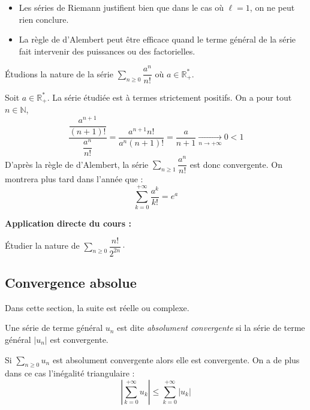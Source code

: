 \documentclass[french,11pt,twoside]{VcCours}
\newenvironment{ApplicationDirecte}{\textbf{Application directe du cours :}

}{}
\newcommand{\Sum}[2]{\ensuremath{\textstyle{\sum\limits_{#1}^{#2}}}}
\begin{document}
\begin{Remarques}{}
	\begin{itemize}
\item Les séries de Riemann justifient bien que dans le cas où $\ell=1$, on ne peut rien conclure.
\item La règle de d'Alembert peut être efficace quand le terme général de la série fait intervenir des puissances ou des factorielles.
	\end{itemize}
\end{Remarques}

\newpage
\begin{Exemple} Étudions la nature de la série $\Sum{n \geq 0}{} \dfrac{a^n}{n!}$ où $a \in \mathbb{R}_+^{*}$.


Soit $a \in \mathbb{R}_{+}^*$. La série étudiée est à termes strictement positifs. On a pour tout $n \in \mathbb{N}$,
$$ \dfrac{\dfrac{a^{n+1}}{(n+1)!}}{\dfrac{a^n}{n!}} = \frac{a^{n+1}n!}{a^n(n+1)!}= \frac{a}{n+1} \underset{n \rightarrow + \infty}{\longrightarrow} 0 <1$$
D'après la règle de d'Alembert, la série $\Sum{n \geq 1}{} \dfrac{a^n}{n!}$ est donc convergente. On montrera plus tard dans l'année que :
$$ \sum_{k=0}^{+\infty} \frac{a^k}{k!} = e^a$$
\end{Exemple}

\begin{ApplicationDirecte} Étudier la nature de $\Sum{n \geq 0}{} \dfrac{n!}{2^{2n}}\cdot$
\end{ApplicationDirecte}
\subsection{Convergence absolue}

Dans cette section, la suite est réelle ou complexe.

\begin{Definition}{} Une série de terme général $u_n$ est dite \emph{absolument convergente} si la série de terme général $\vert u_n \vert$ est convergente.
\end{Definition}

\begin{Theoreme}{} Si $\Sum{n \geq 0}{} u_n$ est absolument convergente alors elle est convergente. On a de plus dans ce cas l'inégalité triangulaire :
$$ \left\vert \sum_{k=0}^{+ \infty} u_k \right\vert \leq \sum_{k=0}^{+ \infty} \vert u_k \vert$$
\end{Theoreme}
\end{document}
